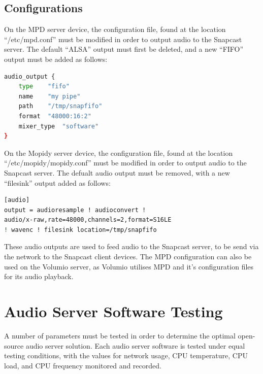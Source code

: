 \documentclass[11pt,a4paper,headinclude=false,footinclude=false]{scrreprt}
\begin{document}
\subsection{Configurations}\label{configurations}

On the MPD server device, the configuration file, found at the location
``/etc/mpd.conf'' must be modified in order to output audio to the
Snapcast server. The default ``ALSA'' output must first be deleted, and
a new ``FIFO'' output must be added as follows:

\lstset{
    caption=MPD SnapServer Configuration,
    basicstyle=\footnotesize, frame=tb,
    xleftmargin=.2\textwidth, xrightmargin=.2\textwidth
}

\begin{lstlisting}[language=bash]
audio_output {
    type    "fifo"
    name    "my pipe"
    path    "/tmp/snapfifo"
    format  "48000:16:2"
    mixer_type  "software"
}
\end{lstlisting}

On the Mopidy server device, the configuration file, found at the
location ``/etc/mopidy/mopidy.conf'' must be modified in order to output
audio to the Snapcast server. The defualt audio output must be removed,
with a new ``filesink'' output added as follows:

\lstset{
    caption=Mopidy SnapServer Configuration,
    basicstyle=\footnotesize, frame=tb,
    xleftmargin=.2\textwidth, xrightmargin=.2\textwidth
}

\begin{lstlisting}[language=bash]
[audio]
output = audioresample ! audioconvert !
audio/x-raw,rate=48000,channels=2,format=S16LE
! wavenc ! filesink location=/tmp/snapfifo
\end{lstlisting}

These audio outputs are used to feed audio to the Snapcast server, to be
send via the network to the Snapcast client devices. The MPD
configuration can also be used on the Volumio server, as Volumio
utilises MPD and it's configuration files for its audio playback.

\section{Audio Server Software
Testing}\label{audio-server-software-testing}

A number of parameters must be tested in order to determine the optimal
open-source audio server solution. Each audio server software is tested
under equal testing conditions, with the values for network usage, CPU
temperature, CPU load, and CPU frequency monitored and recorded.
\end{document}
